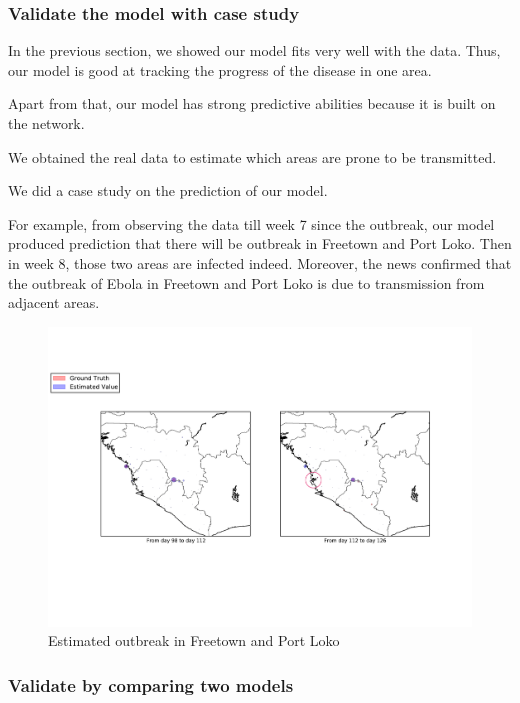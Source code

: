 \documentclass[11pt]{article}
\begin{document}
\subsubsection{Validate the model with case study}
In the previous section, we showed our model fits very well with the data. Thus, our model is good at tracking the progress of the disease in one area. 

Apart from that, our model has strong predictive abilities because it is built on the network.

We obtained the real data to estimate which areas are prone to be transmitted.

We did a case study on the prediction of our model. 

For example, from observing the data till week 7 since the outbreak, our model produced prediction that there will be outbreak in Freetown and Port Loko. Then in week 8, those two areas are infected indeed. Moreover, the news\cite{ebolanew} confirmed that the outbreak of Ebola in Freetown and Port Loko is due to transmission from adjacent areas.


\begin{figure}[hbt]
\begin{center}
  \includegraphics[width=6in]{graph/est22.pdf}
  \caption{Estimated outbreak in Freetown and Port Loko}
  \label{est22}
\end{center}  
\end{figure}


\subsubsection{Validate by comparing two models}
\end{document}
